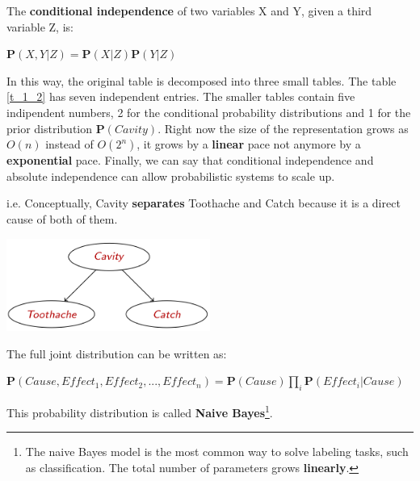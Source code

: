 \begin{definition}
    The \textbf{conditional independence} of two variables X and Y, given a third variable Z, is:
    \begin{center}
        $\mathbf{P}(X,Y|Z)=\mathbf{P}(X|Z)\mathbf{P}(Y|Z)$
    \end{center}
\end{definition}
In this way, the original table is decomposed into three small tables. The table \ref{t_1_2} has seven independent entries. The smaller tables contain five indipendent numbers, 2 for the conditional probability distributions and 1 for the prior distribution $\mathbf{P}(Cavity)$. Right now the size of the representation grows as $O(n)$ instead of $O(2^n)$, it grows by a \textbf{linear} pace not anymore by a \textbf{exponential} pace. Finally, we can say that conditional independence and absolute independence can allow probabilistic systems to scale up.
\begin{example}
    i.e. Conceptually, Cavity \textbf{separates} Toothache and Catch because it is a direct cause of both of them. \vspace{3.5pt}
    \begin{center}
        \includegraphics[width=0.5\textwidth]{img/img1.png}
    \end{center}
\end{example}
\begin{definition}
    The full joint distribution can be written as: \vspace{3.5pt}

    \begin{center}
        $\mathbf{P}(Cause, Effect_1, Effect_2, ..., Effect_n) = \mathbf{P}(Cause)\prod_i\mathbf{P}(Effect_i|Cause)$
    \end{center} \vspace{3.5pt}

    This probability distribution is called \textbf{Naive Bayes}\footnote{The naive Bayes model is the most common way to solve labeling tasks, such as classification. The total number of parameters grows \textbf{linearly}.}.
\end{definition}